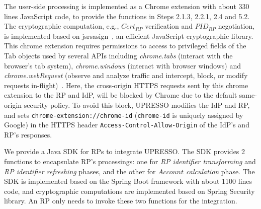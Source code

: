 The user-side processing is implemented as a Chrome extension with about 330 lines JavaScript code, to provide the functions in Steps 2.1.3, 2.2.1, 2.4 and 5.2.
The cryptographic computation, e.g., $Cert_{RP}$ verification and $PID_{RP}$ negotiation, is implemented based on jsrsasign~\cite{jsrsasign}, an efficient JavaScript cryptographic library.
This chrome extension requires permissions to access to privileged fields of the Tab objects used by several APIs including \emph{chrome.tabs} (interact with the browser's tab system), \emph{chrome.windows} (interact with browser windows) and \emph{chrome.webRequest} (observe and analyze traffic and intercept, block, or modify requests in-flight)~\cite{chromeExtension}.  
Here, the cross-origin HTTPS requests sent by this chrome extension to the RP and IdP, will be blocked by Chrome due to the default same-origin security policy.
To avoid this block, UPRESSO modifies the IdP and RP, and sets \verb+chrome-extension://chrome-id+ (\verb+chrome-id+ is uniquely assigned by Google) in the HTTPS header \verb+Access-Control-Allow-Origin+ of the IdP's and RP's responses.

We provide a Java SDK for RPs to integrate UPRESSO. 
The SDK provides 2 functions to encapsulate RP's processings: one for  \emph{RP identifier transforming} and \emph{RP identifier refreshing} phases, and the other for \emph{$Account$ calculation} phase. %
The SDK is implemented based on the Spring Boot framework  with about 1100 lines code, and cryptographic computations are implemented based on Spring Security library.
An RP only needs to invoke these two functions for the integration.


